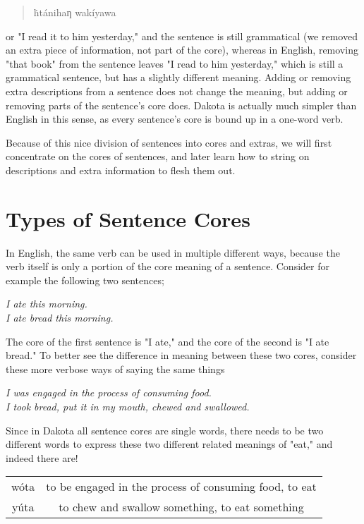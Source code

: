 \documentclass[10pt,letter]{article}
\newcommand\dak[1]{{\dakota #1}}
\newenvironment{sentence}
{
\begin{quote}\begin{center}
}
{\end{center}\end{quote}}
\newenvironment{BilingCol}
{\begin{center}\begin{tabular}{>{\dakota}c>{}c}

}
{\end{tabular}\end{center}}
\begin{document}
\begin{sentence}
\dak{ḣtánihaƞ wakíyawa}
\end{sentence}

or "I read it to him yesterday," and the sentence is still grammatical (we removed an extra piece of information, not part of the core), whereas in English, removing "that book" from the sentence leaves "I read to him yesterday," which is still a grammatical sentence, but has a slightly different meaning.  Adding or removing extra descriptions from a sentence does not change the meaning, but adding or removing parts of the sentence's core does.  Dakota is actually much simpler than English in this sense, as every sentence's core is bound up in a one-word verb.

Because of this nice division of sentences into cores and extras, we will first concentrate on the cores of sentences, and later learn how to string on descriptions and extra information to flesh them out.


    \section{Types of Sentence Cores}

In English, the same verb can be used in multiple different ways, because the verb itself is only a portion of the core meaning of a sentence.  Consider for example the following two sentences;

\begin{center}
\emph{I ate this morning.}\\
\emph{I ate bread this morning.}
\end{center}

The core of the first sentence is "I ate," and the core of the second is "I ate bread."  To better see the difference in meaning between these two cores, consider these more verbose ways of saying the same things

\begin{center}
\emph{I was engaged in the process of consuming food.}\\
\emph{I took bread, put it in my mouth, chewed and swallowed.}
\end{center}

Since in Dakota all sentence cores are single words, there needs to be two different words to express these two different related meanings of "eat," and indeed there are!

\begin{BilingCol}
  wóta & to be engaged in the process of consuming food, to eat\\
  yúta  & to chew and swallow something, to eat something \\
\end{BilingCol}
\end{document}
